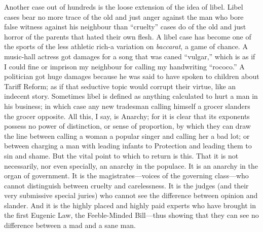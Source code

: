 \documentclass{book}
\begin{document}
Another case out of hundreds is the loose extension of the idea of libel. Libel cases bear no more trace of the old and just anger against the man who bore false witness against his neighbour than “cruelty” cases do of the old and just horror of the parents that hated their own flesh. A libel case has become one of the sports of the less athletic rich-a variation on \emph{baccarat}, a game of chance. A music-hall actress got damages for a song that was caned “vulgar,” which is as if I could fine or imprison my neighbour for calling my handwriting “rococo.” A politician got huge damages because he was said to have spoken to children about Tariff Reform; as if that seductive topic would corrupt their virtue, like an indecent story. Sometimes libel is defined as anything calculated to hurt a man in his business; in which case any new tradesman calling himself a grocer slanders the grocer opposite. All this, I say, is Anarchy; for it is clear that its exponents possess no power of distinction, or sense of proportion, by which they can draw the line between calling a woman a popular singer and calling her a bad lot; or between charging a man with leading infants to Protection and leading them to sin and shame. But the vital point to which to return is this. That it is not necessarily, nor even specially, an anarchy in the populace. It is an anarchy in the organ of government. It is the magistrates—voices of the governing class—who cannot distinguish between cruelty and carelessness. It is the judges (and their very submissive special juries) who cannot see the difference between opinion and slander. And it is the highly placed and highly paid experts who have brought in the first Eugenic Law, the Feeble-Minded Bill—thus showing that they can see no difference between a mad and a sane man.
\end{document}
